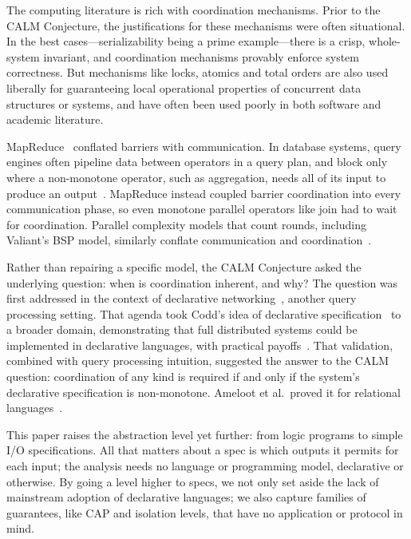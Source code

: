 \documentclass[sigconf]{cidr-2027}
\theoremstyle{remark}
\newcommand{\spectype}[1][]{I/O specification#1\xspace}
\begin{document}
The computing literature is rich with coordination mechanisms. Prior to the CALM
Conjecture, the justifications for these mechanisms were often situational.
In the best cases---serializability being a prime example---there is a crisp,
whole-system invariant, and coordination mechanisms provably enforce system
correctness.  But mechanisms like locks, atomics and total orders are also used
liberally for guaranteeing local operational properties of concurrent data
structures or systems, and have often been used poorly in both software and
academic literature.

MapReduce~\cite{dean2004mapreduce} conflated barriers with communication. In database systems, query
engines often pipeline data between operators in a query plan, and block only
where a non-monotone operator, such as aggregation, needs all of its input to
produce an output~\cite{wilschut1991dataflow,graefe1990volcano}. MapReduce
instead coupled barrier coordination into every communication phase,
so even monotone parallel operators like join had to wait for coordination.
Parallel complexity models that count rounds, including Valiant's BSP model,
similarly conflate communication and
coordination~\cite{valiant1990bsp,karloff2010mrc}.

Rather than repairing a specific model, the CALM Conjecture asked the underlying
question: when is coordination inherent, and why? The question was
first addressed in the context of declarative
networking~\cite{loo2009declarative}, another query processing setting. That
agenda took Codd's idea of declarative
specification~\cite{codd1970relational} to a broader domain,
demonstrating that full distributed systems could be implemented in declarative
languages, with practical
payoffs~\cite{loo2005overlays,loo2009declarative,chu2007declarative,alvaro2010boom,alvaro2011bloom}.
That validation, combined with query processing intuition, suggested the answer
to the CALM question: coordination of any kind is required if and only if the
system's declarative specification is non-monotone. Ameloot et al.\ proved it
for relational languages~\cite{ameloot2013relational}.

This paper raises the abstraction level yet further: from logic programs to simple
\spectype[s]. All that matters about a spec is which outputs it
permits for each input; the analysis needs no language or programming model,
declarative or otherwise. By going a level higher to specs, we not only set
aside the lack of mainstream adoption of declarative languages; we also capture
families of guarantees, like CAP and isolation levels, that have no application
or protocol in mind.
\end{document}
